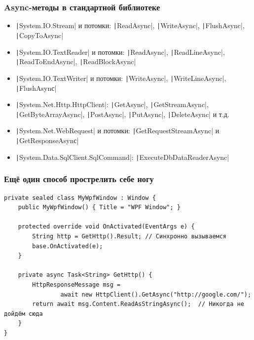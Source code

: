 \documentclass[xetex,mathserif,serif]{beamer}
\begin{document}
	\begin{frame}
		\frametitle{Async-методы в стандартной библиотеке}
		\begin{itemize}
			\item \texttt|System.IO.Stream| и потомки: \texttt|ReadAsync|, \texttt|WriteAsync|, \texttt|FlushAsync|, \texttt|CopyToAsync|
			\item \texttt|System.IO.TextReader| и потомки: \texttt|ReadAsync|, \texttt|ReadLineAsync|, \texttt|ReadToEndAsync|, \texttt|ReadBlockAsync|
			\item \texttt|System.IO.TextWriter| и потомки: \texttt|WriteAsync|, \texttt|WriteLineAsync|, \texttt|FlushAsynс|
			\item \texttt|System.Net.Http.HttpClient|: \texttt|GetAsync|, \texttt|GetStreamAsync|, \texttt|GetByteArrayAsync|, \texttt|PostAsync|, \texttt|PutAsync|, \texttt|DeleteAsync| и т.д.
			\item \texttt|System.Net.WebRequest| и потомки: \texttt|GetRequestStreamAsync| и \texttt|GetResponseAsynс|
			\item \texttt|System.Data.SqlClient.SqlCommand|: \texttt|ExecuteDbDataReaderAsync|
		\end{itemize}
	\end{frame}

	\begin{frame}[fragile]
		\frametitle{Ещё один способ прострелить себе ногу}
		\begin{footnotesize}
			\begin{verbatim}
private sealed class MyWpfWindow : Window {
    public MyWpfWindow() { Title = "WPF Window"; }

    protected override void OnActivated(EventArgs e) {
        String http = GetHttp().Result; // Синхронно вызываемся
        base.OnActivated(e);
    }

    private async Task<String> GetHttp() {
        HttpResponseMessage msg = 
                await new HttpClient().GetAsync("http://google.com/");
        return await msg.Content.ReadAsStringAsync();  // Никогда не дойдём сюда
    }
}
			\end{verbatim}
		\end{footnotesize}
	\end{frame}
\end{document}
